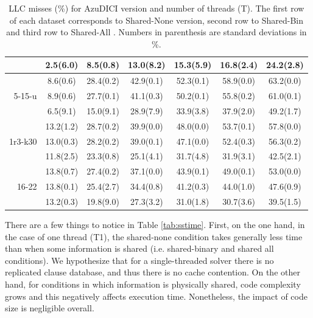 \begin{table}[h]
\begin{tabular}[h]{rcccccc}
      & 2.5(6.0)  &      8.5(0.8)   &       13.0(8.2)    &      15.3(5.9) &      16.8(2.4)    &   24.2(2.8)   \\ \hline  
      \multirow{3}{*}{5-15-u}     &       8.6(0.6)    &   28.4(0.2)    &   42.9(0.1)    &   52.3(0.1)   &    58.9(0.0)   &    63.2(0.0)    \\ 
      & 8.9(0.6)   &     27.7(0.1)   &    41.1(0.3)   &       50.2(0.1) &          55.8(0.2)    &      61.0(0.1)       \\ 
      &    6.5(9.1)    &    15.0(9.1)    &      28.9(7.9)   &        33.9(3.8)  &    37.9(2.0)    &   49.2(1.7)   \\ \hline           
      \multirow{3}{*}{1r3-k30}     &       13.2(1.2)   &    28.7(0.2)   &    39.9(0.0)      & 48.0(0.0)   &    53.7(0.1)     &  57.8(0.0)    \\ 
      & 13.0(0.3)  &     28.2(0.2)   &    39.0(0.1)    &      47.1(0.0)  &        52.4(0.3)    &      56.3(0.2)       \\ 
      & 11.8(2.5)   &     23.3(0.8)    &      25.1(4.1)     &     31.7(4.8)  &     31.9(3.1)    &   42.5(2.1)   \\ \hline
      \multirow{3}{*}{16-22}   &       13.8(0.7)  &     27.4(0.2)    &   37.1(0.0)  &     43.9(0.1)    &   49.0(0.1)    &   53.0(0.0)    \\ 
      & 13.8(0.1)   &    25.4(2.7)    &   34.4(0.8)     &     41.2(0.3)     &     44.0(1.0)    &      47.6(0.9)       \\ 
      & 13.2(0.3) &       19.8(9.0)    &      27.3(3.2)   &        31.0(1.8)  &     30.7(3.6)   &    39.5(1.5)   \\ \hline


      \end{tabular}
    \normalsize
    \caption{LLC misses (\%) for AzuDICI version and number of threads (T). The first row of each dataset corresponds to Shared-None version, second row to Shared-Bin and third row to Shared-All  . Numbers in parenthesis are standard deviations in \%.}
    \label{tab:sscachemisses}
\end{table}


There are a few things to notice in Table \ref{tab:sstime}. First, on
the one hand, in the case of one thread (T1), the shared-none
condition takes generally less time than when some information is
shared (i.e. shared-binary and shared all conditions). We hypothesize
that for a single-threaded solver there is no replicated clause
database, and thus there is no cache contention. On the other hand,
for conditions in which information is physically shared, code
complexity grows and this negatively affects execution
time. Nonetheless, the impact of code size is negligible overall.

